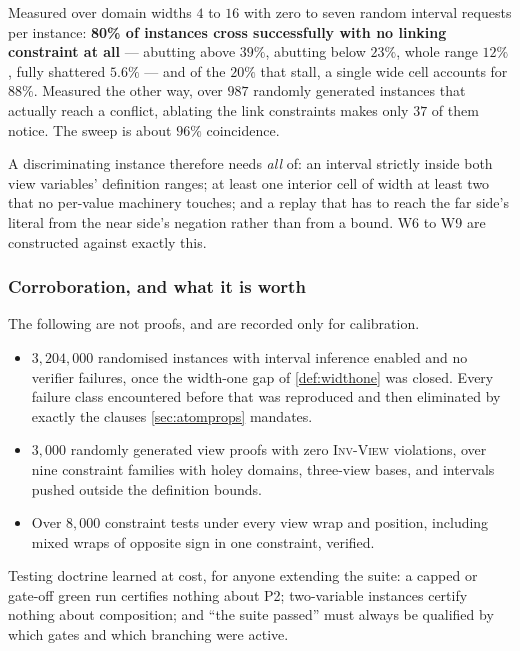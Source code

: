 \documentclass[11pt,a4paper]{article}
\theoremstyle{plain}
\theoremstyle{definition}
\theoremstyle{remark}
\newcommand{\inv}[1]{\textnormal{\textsc{Inv-#1}}}
\newcommand{\invView}{\inv{View}}
\begin{document}
Measured over domain widths $4$ to $16$ with zero to seven random interval
requests per instance: \textbf{80\% of instances cross successfully with no
linking constraint at all} --- abutting above $39\%$, abutting below $23\%$, whole
range $12\%$, fully shattered $5.6\%$ --- and of the $20\%$ that stall, a single
wide cell accounts for $88\%$.  Measured the other way, over $987$ randomly
generated instances that actually reach a conflict, ablating the link constraints
makes only $37$ of them notice.  The sweep is about $96\%$ coincidence.

A discriminating instance therefore needs \emph{all} of: an interval strictly
inside both view variables' definition ranges; at least one interior cell of
width at least two that no per-value machinery touches; and a replay that has to
reach the far side's literal from the near side's negation rather than from a
bound.  W6 to W9 are constructed against exactly this.

\subsubsection*{Corroboration, and what it is worth}

The following are not proofs, and are recorded only for calibration.

\begin{itemize}[itemsep=1pt]
  \item $3{,}204{,}000$ randomised instances with interval inference enabled and
    no verifier failures, once the width-one gap of \cref{def:widthone} was
    closed.  Every failure class encountered before that was reproduced and then
    eliminated by exactly the clauses \cref{sec:atomprops} mandates.
  \item $3{,}000$ randomly generated view proofs with zero \invView{} violations,
    over nine constraint families with holey domains, three-view bases, and
    intervals pushed outside the definition bounds.
  \item Over $8{,}000$ constraint tests under every view wrap and position,
    including mixed wraps of opposite sign in one constraint, verified.
\end{itemize}

Testing doctrine learned at cost, for anyone extending the suite: a capped or
gate-off green run certifies nothing about P2; two-variable instances certify
nothing about composition; and ``the suite passed'' must always be qualified by
which gates and which branching were active.
\end{document}
